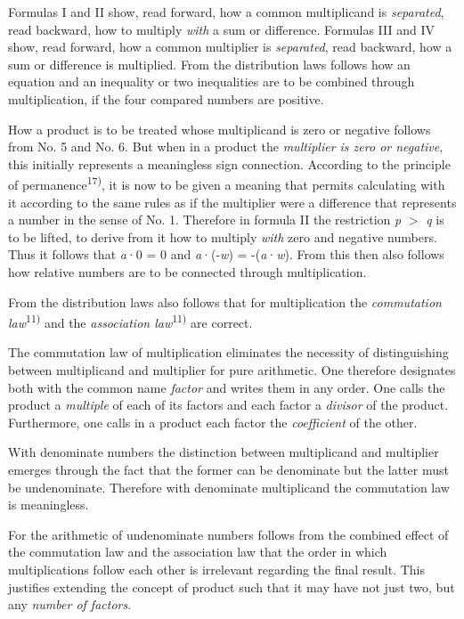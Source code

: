 \thispagestyle{fancy}

\vspace{0.5cm}

Formulas I and II show, read forward, how a common multiplicand is \textit{separated}, read backward, how to multiply \textit{with} a sum or difference. Formulas III and IV show, read forward, how a common multiplier is \textit{separated}, read backward, how a sum or difference is multiplied. From the distribution laws follows how an equation and an inequality or two inequalities are to be combined through multiplication, if the four compared numbers are positive.

How a product is to be treated whose multiplicand is zero or negative follows from No. 5 and No. 6. But when in a product the \textit{multiplier is zero or negative}, this initially represents a meaningless sign connection. According to the principle of permanence\textsuperscript{17)}, it is now to be given a meaning that permits calculating with it according to the same rules as if the multiplier were a difference that represents a number in the sense of No. 1. Therefore in formula II the restriction \textit{p} $>$ \textit{q} is to be lifted, to derive from it how to multiply \textit{with} zero and negative numbers. Thus it follows that \textit{a}·0 = 0 and \textit{a}·(-\textit{w}) = -(\textit{a}·\textit{w}). From this then also follows how relative numbers are to be connected through multiplication.

From the distribution laws also follows that for multiplication the \textit{commutation law}\textsuperscript{11)} and the \textit{association law}\textsuperscript{11)} are correct.

The commutation law of multiplication eliminates the necessity of distinguishing between multiplicand and multiplier for pure arithmetic. One therefore designates both with the common name \textit{factor} and writes them in any order. One calls the product a \textit{multiple} of each of its factors and each factor a \textit{divisor} of the product. Furthermore, one calls in a product each factor the \textit{coefficient} of the other.

With denominate numbers the distinction between multiplicand and multiplier emerges through the fact that the former can be denominate but the latter must be undenominate. Therefore with denominate multiplicand the commutation law is meaningless.

For the arithmetic of undenominate numbers follows from the combined effect of the commutation law and the association law that the order in which multiplications follow each other is irrelevant regarding the final result. This justifies extending the concept of product such that it may have not just two, but any \textit{number of factors}.
